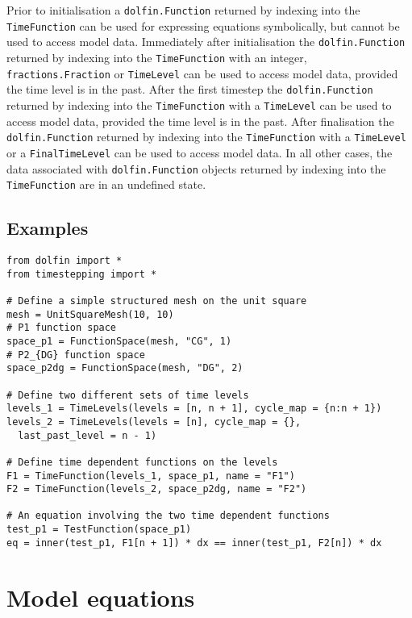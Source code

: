 \documentclass[a4paper]{book}
\begin{document}
Prior to initialisation a \verb+dolfin.Function+ returned by indexing into the
\verb+TimeFunction+ can be used for expressing equations symbolically, but
cannot be used to access model data. Immediately after initialisation the
\linebreak \verb+dolfin.Function+ returned by indexing into the
\verb+TimeFunction+ with an integer, \verb+fractions.Fraction+ or
\verb+TimeLevel+ can be used to access model data, provided the time level is in
the past. After the first timestep the \verb+dolfin.Function+ returned by
indexing into the \verb+TimeFunction+ with a \verb+TimeLevel+ can be used to
access model data, provided the time level is in the past. After finalisation
the \verb+dolfin.Function+ returned by indexing into the \verb+TimeFunction+
with a \verb+TimeLevel+ or a \verb+FinalTimeLevel+ can be used to access model
data. In all other cases, the data associated with \verb+dolfin.Function+
objects returned by indexing into the \verb+TimeFunction+ are in an undefined
state.

\subsection*{Examples}

\begin{lstlisting}
from dolfin import *
from timestepping import *

# Define a simple structured mesh on the unit square
mesh = UnitSquareMesh(10, 10)
# P1 function space
space_p1 = FunctionSpace(mesh, "CG", 1)
# P2_{DG} function space
space_p2dg = FunctionSpace(mesh, "DG", 2)

# Define two different sets of time levels
levels_1 = TimeLevels(levels = [n, n + 1], cycle_map = {n:n + 1})
levels_2 = TimeLevels(levels = [n], cycle_map = {},
  last_past_level = n - 1)

# Define time dependent functions on the levels
F1 = TimeFunction(levels_1, space_p1, name = "F1")
F2 = TimeFunction(levels_2, space_p2dg, name = "F2")

# An equation involving the two time dependent functions
test_p1 = TestFunction(space_p1)
eq = inner(test_p1, F1[n + 1]) * dx == inner(test_p1, F2[n]) * dx
\end{lstlisting}

\section{Model equations}\label{sect:equations}
\end{document}
